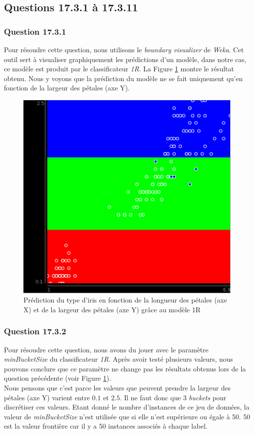 \documentclass[10pt,a4paper]{article}
\begin{document}
		\subsection{Questions 17.3.1 à 17.3.11}
		
			\subsubsection*{Question 17.3.1}
			
			Pour résoudre cette question, nous utilisons le \textit{boundary visualizer} de \textit{Weka}. Cet outil sert à visualiser graphiquement les prédictions d'un modèle, dans notre cas, ce modèle est produit par le classificateur \textit{1R}. La Figure \ref{fig:iris:OneR} montre le résultat obtenu. Nous y voyons que la prédiction du modèle ne se fait uniquement qu'en fonction de la largeur des pétales (axe Y).
			
			\begin{figure}[h]
				\centering
				\includegraphics[width=.5\textwidth]{iris_OneR}
				\caption{Prédiction du type d'iris en fonction de la longueur des pétales (axe X) et de la largeur des pétales (axe Y) grâce au modèle 1R}
				\label{fig:iris:OneR}
			\end{figure}
			
			\subsubsection*{Question 17.3.2}
			
			Pour résoudre cette question, nous avons du jouer avec le paramètre \textit{minBucketSize} du classificateur \textit{1R}. Après avoir testé plusieurs valeurs, nous pouvons conclure que ce paramètre ne change pas les résultats obtenus lors de la question précédente (voir Figure \ref{fig:iris:OneR}).\\
			
			Nous pensons que c'est parce les valeurs que peuvent prendre la largeur des pétales (axe Y) varient entre $0.1$ et $2.5$. Il ne faut donc que 3 \textit{buckets} pour discrétiser ces valeurs. Etant donné le nombre d'instances de ce jeu de données, la valeur de \textit{minBucketSize} n'est utilisée que si elle n'est supérieure ou égale à 50. 50 est la valeur frontière car il y a 50 instances associés à chaque label.
			
\end{document}
